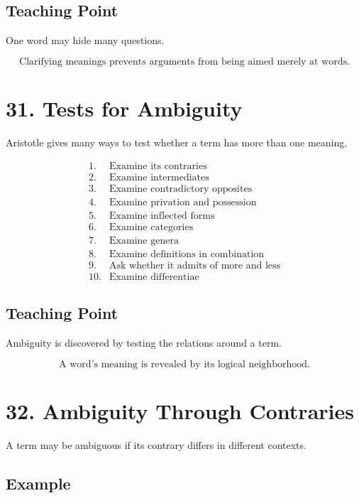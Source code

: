 \documentclass[12pt]{article}
\begin{document}
\subsection*{Teaching Point}

One word may hide many questions.

\[
\boxed{
\text{Clarifying meanings prevents arguments from being aimed merely at words.}
}
\]

\section*{31. Tests for Ambiguity}

Aristotle gives many ways to test whether a term has more than one meaning.

\[
\begin{array}{ll}
1. & \text{Examine its contraries} \\
2. & \text{Examine intermediates} \\
3. & \text{Examine contradictory opposites} \\
4. & \text{Examine privation and possession} \\
5. & \text{Examine inflected forms} \\
6. & \text{Examine categories} \\
7. & \text{Examine genera} \\
8. & \text{Examine definitions in combination} \\
9. & \text{Ask whether it admits of more and less} \\
10. & \text{Examine differentiae}
\end{array}
\]

\subsection*{Teaching Point}

Ambiguity is discovered by testing the relations around a term.

\[
\boxed{
\text{A word's meaning is revealed by its logical neighborhood.}
}
\]

\section*{32. Ambiguity Through Contraries}

A term may be ambiguous if its contrary differs in different contexts.

\subsection*{Example}
\end{document}
